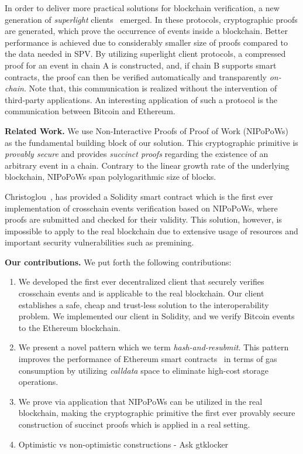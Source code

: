 In order to deliver more practical solutions for blockchain verification, a new
generation of \emph{superlight}
clients~\cite{popow,nipopows,compactsuperblocks, flyclient} emerged. In these
protocols, cryptographic proofs are generated, which prove the occurrence of
events inside a blockchain. Better performance is achieved due to considerably
smaller size of proofs compared to the data needed in SPV. By utilizing
superlight client protocols, a compressed proof for an event in chain A is
constructed, and, if chain B supports smart contracts, the proof can then be
verified automatically and transparently \emph{on-chain}.  Note that, this
communication is realized without the intervention of third-party applications.
An interesting application of such a protocol is the communication between
Bitcoin and Ethereum.

\noindent

\textbf{Related Work.} We use Non-Interactive Proofs of Proof of Work
(NIPoPoWs)~\cite{nipopows} as the fundamental building block of our solution.
This cryptographic primitive is \emph{provably secure} and provides
\emph{succinct proofs} regarding the existence of an arbitrary event in a
chain. Contrary to the linear growth rate of the underlying blockchain,
NIPoPoWs span polylogarithmic size of blocks.

Christoglou~\cite{gglou}, has provided a Solidity smart contract which is the first
ever implementation of crosschain events verification based on NIPoPoWs, where
proofs are submitted and checked for their validity. This solution, however, is
impossible to apply to the real blockchain due to extensive usage of resources
and important security vulnerabilities such as premining.

\noindent

\textbf{Our contributions.} We put forth the following contributions:
\begin{enumerate}
\item We developed the first ever decentralized client that securely verifies
crosschain events and is applicable to the real blockchain. Our client
establishes a safe, cheap and trust-less solution to the interoperability
problem. We implemented our client in Solidity, and we verify Bitcoin events
to the Ethereum blockchain.
\item We present a novel pattern which we term \emph{hash-and-resubmit}. This
pattern improves the performance of Ethereum smart contracts~\cite{wood,
buterin} in terms of gas consumption by utilizing \emph{calldata} space to
eliminate high-cost storage operations.
\item We prove via application that NIPoPoWs can be utilized in the real
blockchain, making the cryptographic primitive the first ever provably secure
construction of succinct proofs which is applied in a real setting.
\item Optimistic vs non-optimistic constructions - Ask gtklocker
\end{enumerate}


